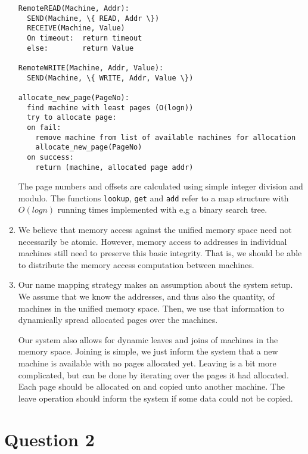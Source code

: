 \documentclass[11pt]{article}
\begin{document}
\begin{enumerate}
\begin{Verbatim}
RemoteREAD(Machine, Addr):
  SEND(Machine, \{ READ, Addr \})
  RECEIVE(Machine, Value)
  On timeout:  return timeout
  else:        return Value

RemoteWRITE(Machine, Addr, Value):
  SEND(Machine, \{ WRITE, Addr, Value \})

allocate_new_page(PageNo):
  find machine with least pages (O(logn))
  try to allocate page:
  on fail:
    remove machine from list of available machines for allocation
    allocate_new_page(PageNo)
  on success:
    return (machine, allocated page addr)

\end{Verbatim}
    The page numbers and offsets are calculated using simple integer division and
    modulo. The functions \verb|lookup|, \verb|get| and \verb|add| refer to a map
    structure with $O(logn)$ running times implemented with e.g a binary search
    tree.

  \item
    We believe that memory access against the unified memory space need not
    necessarily be atomic. However, memory access to addresses in individual
    machines still need to preserve this basic integrity. That is, we should be able
    to distribute the memory access computation between machines.

  \item
    Our name mapping strategy makes an assumption about the system setup.
    We assume that we know the addresses, and thus also the quantity, of machines in
    the unified memory space. Then, we use that information to dynamically spread
    allocated pages over the machines.

    Our system also allows for dynamic leaves and joins of machines in the memory
    space. Joining is simple, we just inform the system that a new machine is
    available with no pages allocated yet. Leaving is a bit more complicated, but
    can be done by iterating over the pages it had allocated. Each page should be
    allocated on and copied unto another machine. The leave operation should inform
    the system if some data could not be copied.
\end{enumerate}

\section{Question 2}
\end{document}
